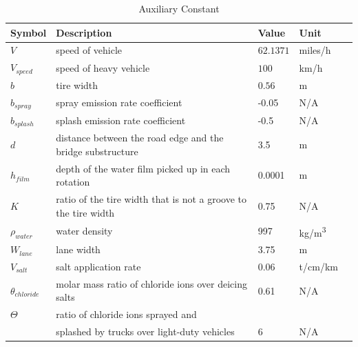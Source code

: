 \documentclass[12pt]{article}
\begin{document}
\begin{table}[!h]

  \renewcommand{\arraystretch}{1.2}
\noindent \begin{longtable*}{l l l l c} 
  \toprule
 \textbf{Symbol} & \textbf{Description} & \textbf{Value} & \textbf{Unit}\\


  \midrule 
  $V$ &  speed of vehicle & $62.1371$ & miles/h   \\
  $V_{speed}$ & speed of heavy vehicle & $100$ & km/h   \\
  $b$ & tire width & $0.56$ & m \\
  
  $b_{spray}$ & spray emission rate coefficient & -0.05 & N/A
  \\
  $b_{splash}$ & splash emission rate coefficient & -0.5 & N/A
  \\
  $d$ & distance between the road edge and the bridge substructure & 3.5 & m
  \\
  $h_{film}$ & depth of the water film picked up in each rotation & 0.0001 & m
  \\
  $K$ & ratio of the tire width that is not a groove to the tire width & 0.75& N/A
  \\
  $\rho_{water}$ & water density & 997 & \si{kg/m^3}
  \\  
  $W_{lane}$ & lane width & 3.75 & m
  \\  
  $V_{salt}$ & salt application rate & 0.06 & t/cm/km
  \\
  $\theta_{chloride}$ &  molar mass ratio of chloride ions over deicing salts & 0.61 & N/A \\
  $\Theta$ & ratio of chloride ions sprayed and  \\
  & splashed by trucks over light-duty vehicles& 6 & N/A  \\  
  
  \bottomrule
\end{longtable*}
  \caption{Auxiliary Constant} \label{TblConstants}
\end{table}


\newpage
\end{document}
